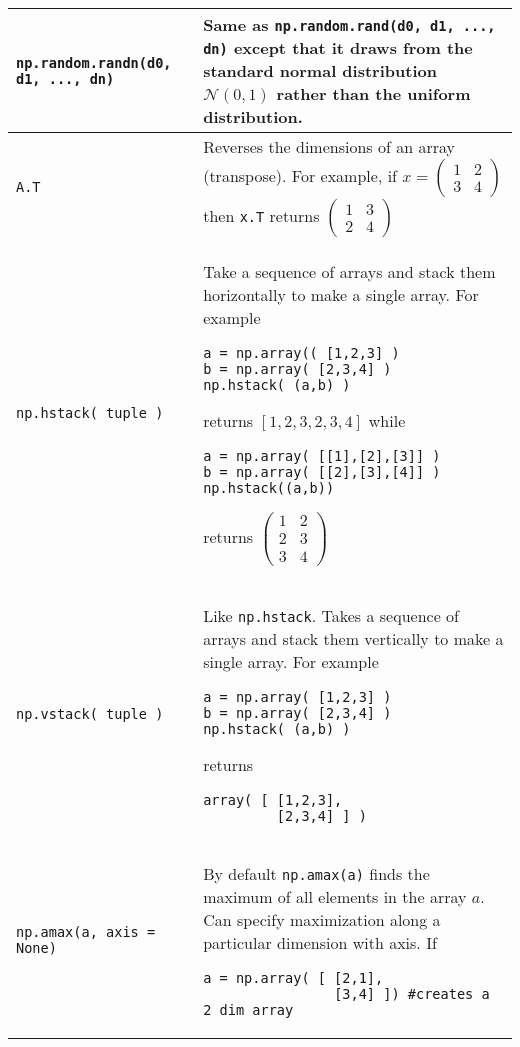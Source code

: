 \documentclass[]{article}
\begin{document}
\begin{longtable}{ | m{6cm}  | m{11cm} |}
	\texttt{np.random.randn(d0, d1, ..., dn)} & Same as {\texttt{np.random.rand(d0, d1, ..., dn)} } except that it draws from the standard normal distribution $\mathcal N(0,1)$ rather than the uniform distribution.
	\\\hline
	\texttt{A.T} & Reverses the dimensions of an array (transpose).  For example, if $x = \left(\begin{matrix} 1& 2\\3&4\end{matrix}\right)$ then \texttt{x.T} returns $\left(\begin{matrix} 1& 3\\2&4\end{matrix}\right)$
	\\\hline
	\texttt{np.hstack( tuple )} & Take a sequence of arrays and stack them horizontally to make a single array.  For example 
	\begin{verbatim}
a = np.array(( [1,2,3] )
b = np.array( [2,3,4] )
np.hstack( (a,b) )
	\end{verbatim}
    returns $[1,2,3,2,3,4]$ while 
	\begin{verbatim}
a = np.array( [[1],[2],[3]] )
b = np.array( [[2],[3],[4]] )
np.hstack((a,b))
	\end{verbatim} 
    returns $\left( \begin{matrix} 1&2\\2&3\\ 3&4 \end{matrix}\right)$
	\\\hline
	\texttt{np.vstack( tuple )} & Like \texttt{np.hstack}.  Takes a sequence of arrays and stack them vertically to make a single array.  For example 
	\begin{verbatim}
a = np.array( [1,2,3] )
b = np.array( [2,3,4] )
np.hstack( (a,b) )
	\end{verbatim}
    returns 
	\begin{verbatim}
array( [ [1,2,3],
         [2,3,4] ] )
	\end{verbatim}
	\\\hline
	\texttt{np.amax(a, axis = None)} & By default {\texttt{np.amax(a)} } finds the maximum of all elements in the array $a$.  Can specify maximization along a particular dimension with axis.  If 
	\begin{verbatim}
a = np.array( [ [2,1],
                [3,4] ]) #creates a 2 dim array
	\end{verbatim}

\end{longtable}
\end{document}
